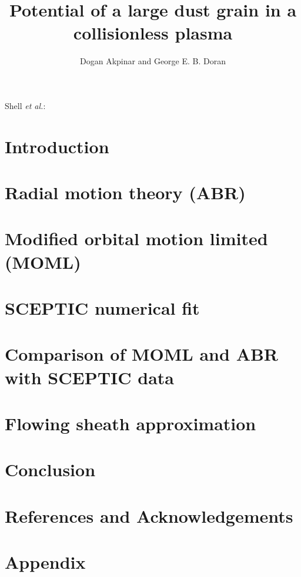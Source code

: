 \documentclass[journal]{Imperial_lab_report}
\begin{document}
\title{Potential of a large dust grain in a collisionless plasma}
\author{Dogan Akpinar and George E. B. Doran}
{Shell \MakeLowercase{\textit{et al.}}:}

\maketitle

\begin{abstract}

\end{abstract}

\section{Introduction}

\section{Radial motion theory (ABR)}
\section{Modified orbital motion limited (MOML)}
\section{SCEPTIC numerical fit}
\section{Comparison of MOML and ABR with SCEPTIC data}
\section{Flowing sheath approximation}
\section{Conclusion}
\section{References and Acknowledgements}











\section{Appendix}
\end{document}
